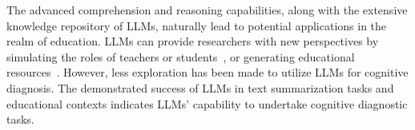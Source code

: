 The advanced comprehension and reasoning capabilities, along with the extensive knowledge repository of LLMs, naturally lead to potential applications in the realm of education.
LLMs can provide researchers with new perspectives by simulating the roles of teachers or students~\cite{wang2024user,li2023adapting,xu2024eduagent,liu2024personality,lin2024e3}, or generating educational resources~\cite{lin2024non,lin2024action,dai2024mpcoder}.
However, less exploration has been made to utilize LLMs for cognitive diagnosis. 
The demonstrated success of LLMs in text summarization tasks and educational contexts indicates LLMs' capability to undertake cognitive diagnostic tasks.

